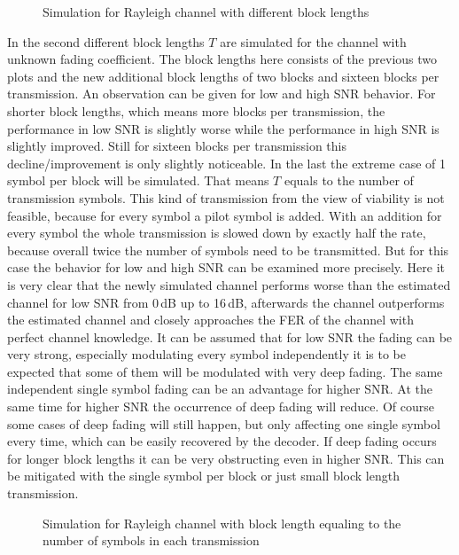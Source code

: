 \begin{figure}[!htb]
	\setlength{}
	\setlength\fheight{0.4\textheight}
	\centering
	
	\caption{Simulation for Rayleigh channel with different block lengths}
	\label{fig:rayfersec}
\end{figure}
In the second  different block lengths \textbf{$T$} are simulated for the channel with unknown fading coefficient. The block lengths here consists of the previous two plots and the new additional block lengths of two blocks and sixteen blocks per transmission.
An observation can be given for low and high \gls{SNR} behavior. For shorter block lengths, which means more blocks per transmission, the performance in low \gls{SNR} is slightly worse while the performance in high \gls{SNR} is slightly improved. Still for sixteen blocks per transmission this decline/improvement is only slightly noticeable.
\newline
In the last  the extreme case of 1 symbol per block will be simulated. That means \textbf{$T$} equals to the number of transmission symbols. This kind of transmission from the view of viability is not feasible, because for every symbol a pilot symbol is added. With an addition for every symbol the whole transmission is slowed down by exactly half the rate, because overall twice the number of symbols need to be transmitted. But for this case the behavior for low and high SNR can be examined more precisely. 
\newline
Here it is very clear that the newly simulated channel performs worse than the estimated channel for low SNR from 0\,dB up to 16\,dB, afterwards the channel outperforms the estimated channel and closely approaches the \gls{FER} of the channel with perfect channel knowledge. It can be assumed that for low SNR the fading can be very strong, especially modulating every symbol independently it is to be expected that some of them will be modulated with very deep fading. The same independent single symbol fading can be an advantage for higher SNR. At the same time for higher SNR the occurrence of deep fading will reduce. Of course some cases of deep fading will still happen, but only affecting one single symbol every time, which can be easily recovered by the decoder. If deep fading occurs for longer block lengths it can be very obstructing even in higher SNR. This can be mitigated with the single symbol per block or just small block length transmission.
\begin{figure}[!htb]
	\setlength{}
	\setlength\fheight{0.4\textheight}
	\centering
		
	\caption{Simulation for Rayleigh channel with block length equaling to the number of symbols in each transmission}
	\label{fig:rayferthird}
\end{figure}



\clearpage
